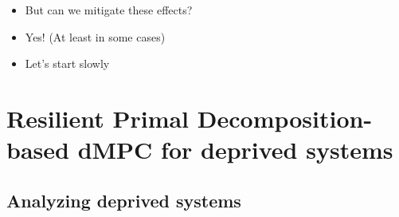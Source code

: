 \documentclass[aspectratio=169]{beamer}
\begin{document}
\begin{frame}{}
  \begin{itemize}[<+(1)->]
    \item But can we mitigate these effects?
    \item Yes! \pause (At least in some cases)
  \end{itemize}

  \begin{itemize}[<+(1)->]
    \item Let's start slowly
  \end{itemize}
\end{frame}

\section{Resilient Primal Decomposition-based dMPC for deprived systems}
\subsection{Analyzing deprived systems}
\end{document}
